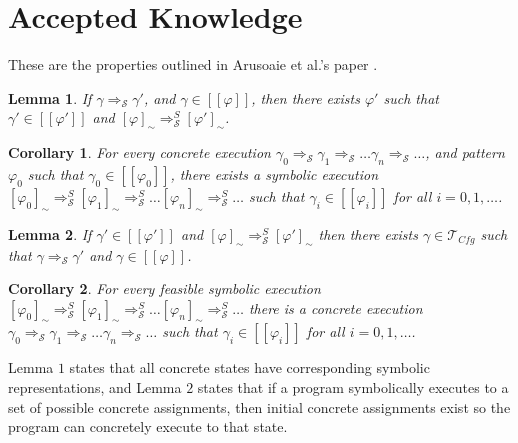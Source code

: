 \documentclass[a4paper]{article}
\newtheorem{lemma}{Lemma}
\newtheorem{cor}{Corollary}
\begin{document}
\section{Accepted Knowledge}
These are the properties outlined in Arusoaie et al.'s paper \cite{arusoaie2013generic}.
\begin{lemma}
If $\gamma \Rightarrow_{\mathcal{S}} \gamma'$, and $\gamma \in [\![\varphi ]\!]$, then there exists $\varphi'$ such that $\gamma' \in [\![\varphi' ]\!]$ and $[\varphi]_{\sim} \Rightarrow_{\mathcal{S}}^S [\varphi']_{\sim}$.
\cite{arusoaie2013generic}
\end{lemma}

\begin{cor}
For every concrete execution $\gamma_0  \Rightarrow_{\mathcal{S}} \gamma_1  \Rightarrow_{\mathcal{S}} \ldots \gamma_n  \Rightarrow_{\mathcal{S}} \ldots$, and pattern $\varphi_0$ such that $\gamma_0 \in [\![\varphi_0 ]\!]$, there exists a symbolic execution $[\varphi_0]_{\sim} \Rightarrow_{\mathcal{S}}^S [\varphi_1]_{\sim} \Rightarrow_{\mathcal{S}}^S \ldots [\varphi_n]_{\sim} \Rightarrow_{\mathcal{S}}^S \ldots $ such that $\gamma_i \in [\![\varphi_i ]\!]$ for all $i = 0, 1, \ldots$.
\cite{arusoaie2013generic}
\end{cor}

\begin{lemma}
If $\gamma' \in [\![\varphi' ]\!]$ and $[\varphi]_{\sim} \Rightarrow_{\mathcal{S}}^S [\varphi']_{\sim}$ then there exists $\gamma \in \mathcal{T}_{\mathit{Cfg}}$ such that $\gamma \Rightarrow_{\mathcal{S}} \gamma'$ and $\gamma \in [\![\varphi]\!]$.
\cite{arusoaie2013generic}
\end{lemma}

\begin{cor}
For every feasible symbolic execution $[\varphi_0]_{\sim} \Rightarrow_{\mathcal{S}}^S [\varphi_1]_{\sim} \Rightarrow_{\mathcal{S}}^S \ldots [\varphi_n]_{\sim} \Rightarrow_{\mathcal{S}}^S \ldots $ there is a concrete execution $\gamma_0  \Rightarrow_{\mathcal{S}} \gamma_1  \Rightarrow_{\mathcal{S}} \ldots \gamma_n  \Rightarrow_{\mathcal{S}} \ldots$ such that $\gamma_i \in [\![\varphi_i ]\!]$ for all $i = 0, 1, \ldots$.
\cite{arusoaie2013generic}
\end{cor}


Lemma $1$ states that all concrete states have corresponding symbolic representations, and Lemma $2$ states that if a program symbolically executes to a set of possible concrete assignments, then initial concrete assignments exist so the program can concretely execute to that state.
\end{document}
